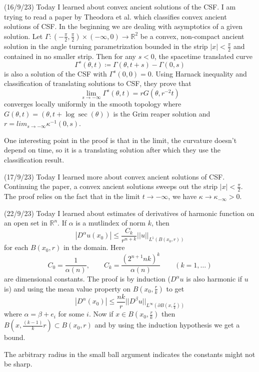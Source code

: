 \documentclass[12pt,a4paper]{article}
\newcommand{\R}{\mathbb{R}}
\begin{document}
(16/9/23) Today I learned about convex ancient solutions of the CSF. I am trying to read a paper by Theodora et al. which classifies convex ancient solutions of CSF. In the beginning we are dealing with asymptotics of a given solution. Let $ \Gamma : (-\frac{\pi}{2}, \frac{\pi}{2}) \times (- \infty, 0) \to \R^{2} $ be a convex, non-compact ancient solution in the angle turning parametrization bounded in the strip $ |x|< \frac{\pi}{2} $ and contained in no smaller strip. Then for any $ s<0 $, the spacetime translated curve 
\[ \Gamma^{s}(\theta, t) \coloneqq \Gamma(\theta, t+s) - \Gamma(0,s) \]
is also a solution of the CSF with $ \Gamma^{s}(0,0) = 0 $. Using Harnack inequality and classification of translating solutions to CSF, they prove that 
\[ \lim_{s \to -\infty} \Gamma^{s}(\theta,t) = rG(\theta, r^{-2}t) \]
converges locally uniformly in the smooth topology where $ G(\theta,t)  = (\theta, t+\log \sec (\theta))$ is the Grim reaper solution and $ r = lim_{s \to -\infty} \kappa^{-1}(0,s)$.

One interesting point in the proof is that in the limit, the curvature doesn't depend on time, so it is a translating solution after which they use the classification result.

(17/9/23) Today I learned more about convex ancient solutions of CSF. Continuing the paper, a convex ancient solutions sweeps out the strip $ |x| < \frac{\pi}{2} $. The proof relies on the fact that in the limit $ t \to - \infty $, we have $ \kappa \to \kappa_{-\infty} >0 $.

(22/9/23) Today I learned about estimates of derivatives of harmonic function on an open set in $ \R^{n} $. If $ \alpha $ is a mutlindex of norm $ k $, then 
\[ |D^{\alpha} u (x_{0})| \le \frac{C_{k}}{r^{n+k}}||u||_{L^{1}(B(x_{0},r))} \]
for each $ B(x_{0},r) $ in the domain. Here 
\[ C_{0} = \frac{1}{\alpha(n)} , \qquad C_{k} = \frac{(2^{n+1}nk)^{k}}{\alpha(n)} \qquad (k = 1, \dots)\]
are dimensional constants. The proof is by induction ($ D^{\alpha}u $ is also harmonic if $ u $ is) and using the mean value property on $ B(x_{0}, \frac{r}{k}) $ to get 
\[ |D^{\alpha}(x_{0})| \le \frac{nk}{r} ||D^{\beta}u||_{L^{\infty}( \partial B(x, \frac{r}{k}))} \]
where $ \alpha = \beta + e_{i} $ for some $ i $. Now if $ x \in B(x_{0}, \frac{r}{k}) $ then $ B(x, \frac{(k-1)}{k}r)  \subset B(x_{0},r)$ and by using the induction hypothesis we get a bound. 

The arbitrary radius in the small ball argument indicates the constants might not be sharp.
\end{document}
